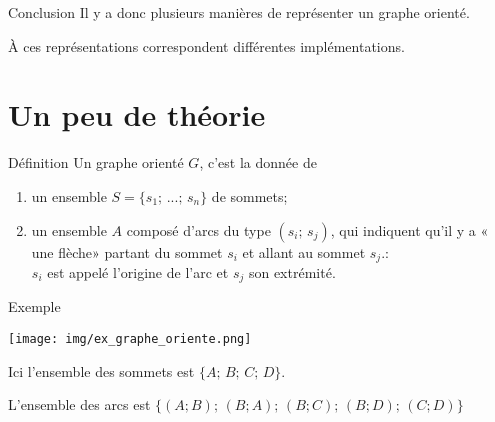 \documentclass[10pt]{beamer}
\begin{document}
\begin{frame}{Conclusion}
Il y a donc plusieurs manières de représenter un graphe orienté.\\\pause

À ces représentations correspondent différentes \alert{implémentations}.
\end{frame}
\section{Un peu de théorie}
\begin{frame}{Définition}
Un graphe orienté $G$, c'est la donnée de\pause
\begin{enumerate}[--]
	\item 	un ensemble $S=\{s_1;\,...;\,s_n\}$ de \alert{sommets};\pause
	\item 	un ensemble $A$ composé d'\alert{arcs} du type $(s_i;\,s_j)$, qui indiquent qu'il y a « une flèche» partant du sommet $s_i$ et allant au sommet $s_j$.:\\ $s_i$ est appelé l'\alert{origine} de l'arc et $s_j$ son \alert{extrémité}.
\end{enumerate}
\end{frame}
\begin{frame}{Exemple}
\begin{center}
\texttt{[image: img/ex\_graphe\_oriente.png]}
\end{center}
\pause
Ici l'ensemble des sommets est $\{A;\,B;\,C;\,D\}$.\\\pause

L'ensemble des arcs est $\{(A;B);\,(B;A);\,(B;C);\,(B;D);\,(C;D)\}$
\end{frame}
\end{document}
